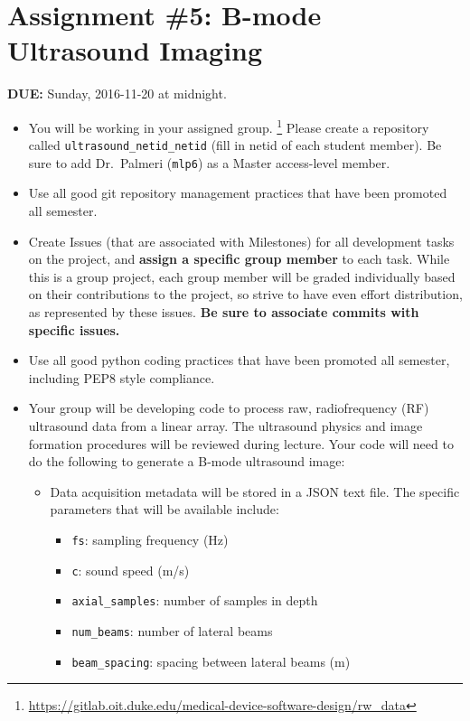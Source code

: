


\section*{Assignment \#5: B-mode Ultrasound Imaging}

{\bf DUE:} Sunday, 2016-11-20 at midnight.

\begin{itemize}

    \item You will be working in your assigned group.
        \footnote{\url{https://gitlab.oit.duke.edu/medical-device-software-design/rw_data}}
        Please create a repository called \verb+ultrasound_netid_netid+ (fill
        in netid of each student member).  Be sure to add Dr.~Palmeri
        (\verb+mlp6+) as a Master access-level member.

    \item Use all good git repository management practices that have been promoted all semester.

    \item Create Issues (that are associated with Milestones) for all
        development tasks on the project, and \textbf{assign a specific group
        member} to each task.  While this is a group project, each group member
        will be graded individually based on their contributions to the
        project, so strive to have even effort distribution, as represented by
        these issues.  \textbf{Be sure to associate commits with specific issues.}

    \item Use all good python coding practices that have been promoted all
        semester, including PEP8 style compliance.

    \item Your group will be developing code to process raw, radiofrequency
        (RF) ultrasound data from a linear array.  The ultrasound physics and
        image formation procedures will be reviewed during lecture.  Your code
        will need to do the following to generate a B-mode ultrasound image:

        \begin{itemize}
            
            \item Data acquisition metadata will be stored in a JSON text file.
                The specific parameters that will be available include:
                \begin{itemize}
                    \item \verb+fs+: sampling frequency (Hz)
                    \item \verb+c+: sound speed (m/s)
                    \item \verb+axial_samples+: number of samples in depth
                    \item \verb+num_beams+: number of lateral beams
                    \item \verb+beam_spacing+: spacing between lateral beams (m)
                \end{itemize}


\end{itemize}
\end{itemize}

